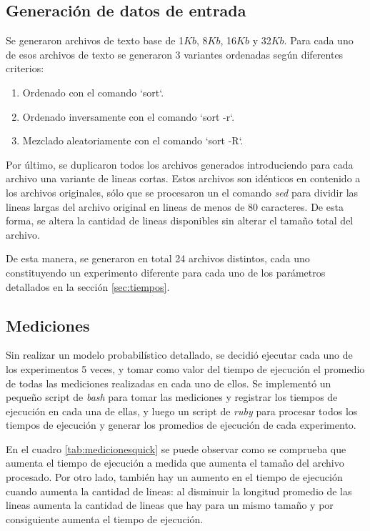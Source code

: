 \documentclass[a4paper,11pt]{article}
\begin{document}
\subsection{Generación de datos de entrada}

Se generaron archivos de texto base de 1\(Kb\), 8\(Kb\), 16\(Kb\) y
32\(Kb\). Para cada uno de esos archivos de texto se generaron 3 variantes
ordenadas según diferentes criterios:

\begin{enumerate}
  \item Ordenado con el comando `sort`.
  \item Ordenado inversamente con el comando `sort -r`.
  \item Mezclado aleatoriamente con el comando `sort -R`.
\end{enumerate}

Por último, se duplicaron todos los archivos generados introduciendo para cada
archivo una variante de lineas cortas. Estos archivos son idénticos en
contenido a los archivos originales, sólo que se procesaron un el comando
\textit{sed} \cite{WIKISED} para dividir las lineas largas del archivo original
en lineas de menos de 80 caracteres. De esta forma, se altera la cantidad de
lineas disponibles sin alterar el tamaño total del archivo.

De esta manera, se generaron en total 24 archivos distintos, cada uno
constituyendo un experimento diferente para cada uno de los parámetros
detallados en la sección \ref{sec:tiempos}.

\subsection{Mediciones}

Sin realizar un modelo probabilístico detallado, se decidió ejecutar cada uno
de los experimentos 5 veces, y tomar como valor del tiempo de ejecución el
promedio de todas las mediciones realizadas en cada uno de ellos. Se implementó
un pequeño script de \textit{bash} \cite{WIKIBASH} para tomar las mediciones y
registrar los tiempos de ejecución en cada una de ellas, y luego un script de
\textit{ruby} \cite{WIKIRUBY} para procesar todos los tiempos de ejecución y
generar los promedios de ejecución de cada experimento.

En el cuadro \ref{tab:medicionesquick} se puede observar como se comprueba que
aumenta el tiempo de ejecución a medida que aumenta el tamaño del archivo
procesado. Por otro lado, también hay un aumento en el tiempo de ejecución
cuando aumenta la cantidad de lineas: al disminuir la longitud promedio de las
lineas aumenta la cantidad de lineas que hay para un mismo tamaño y por
consiguiente aumenta el tiempo de ejecución.
\end{document}
